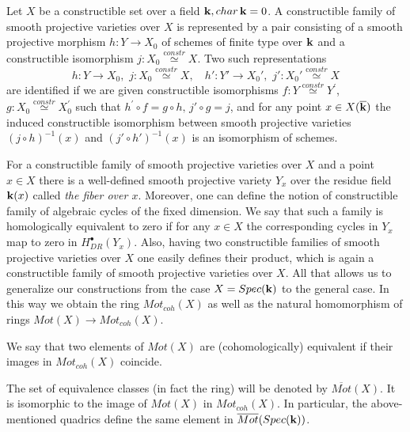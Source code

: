 \documentclass[12pt]{article}
\begin{document}
\begin{defn} Let $X$ be a constructible set over a field ${\bf k}, char\,{\bf k}=0$.
A constructible family of smooth projective varieties over $X$ is represented by a pair consisting of a smooth projective morphism
$h:Y\to X_0$ of schemes of finite type over ${\bf k}$ and a constructible isomorphism $j:X_0\stackrel{\mathrm constr}{\simeq} X$.
Two such representations
$$h:Y\to X_0,\,\,j:X_0\stackrel{\mathrm constr}{\simeq}X,\,\,\,\;\,h':Y'\to X_0',\,\,j':X_0'\stackrel{\mathrm constr}{\simeq}X$$
are identified if  we are given constructible isomorphisms $f:Y \stackrel{\mathrm constr}{\simeq}Y^{\prime}$, 
$g: X_0\stackrel{\mathrm constr}{\simeq}X_0^{\prime}$ such that $h^{\prime}\circ f=g\circ h,\,j'\circ g=j$, and for any point
  $x\in X(\overline{{\bf k}})$ the induced constructible isomorphism between smooth projective varieties $(j\circ h)^{-1}(x)$ and
$(j'\circ h')^{-1}(x)$ is an isomorphism of schemes.
\end{defn}
For a constructible family of smooth projective varieties over $X$ and a point $x\in X$ there is a well-defined smooth projective variety $Y_x$ over the residue field ${\bf k}(x)$ called {\it the fiber over $x$}.  Moreover, one can define the notion of constructible family of algebraic cycles of the fixed dimension. We say that such a family is homologically equivalent to zero if for any $x\in X$ the corresponding cycles in $Y_x$ map to zero in $H_{DR}^{\bullet}(Y_x)$. Also, having two constructible families of smooth projective varieties over $X$ one easily defines their product, which is again a  constructible family of smooth projective varieties over $X$. All that allows us to generalize our constructions from the case $X=Spec({\bf k})$ to the general case. In this way we obtain the ring $Mot_{coh}(X)$ as well as the natural homomorphism of rings $Mot(X)\to Mot_{coh}(X)$.

\begin{defn} We say that two elements of $Mot(X)$ are (cohomologically) equivalent if their images in $Mot_{coh}(X)$ coincide.



\end{defn}

The set of equivalence classes (in fact the ring) will be denoted by $\overline{Mot}(X)$. It is isomorphic to the image of $Mot(X)$ in $Mot_{coh}(X)$. In particular, the above-mentioned quadrics define the same element in $\overline{Mot}(Spec({\bf k}))$.
\end{document}
